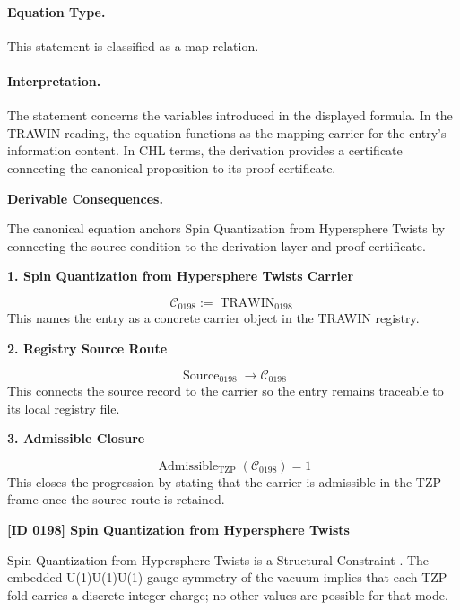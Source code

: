 \paragraph{Equation Type.}
This statement is classified as a map relation.

\paragraph{Interpretation.}
The statement concerns the variables introduced in the displayed formula. In the TRAWIN reading, the equation functions as the mapping carrier for the entry’s information content. In CHL terms, the derivation provides a certificate connecting the canonical proposition to its proof certificate.

\par\vspace{0.35em}
\noindent\textbf{Derivable Consequences.}\quad
\begingroup
\footnotesize
\raggedright
The canonical equation anchors Spin Quantization from Hypersphere Twists by connecting the source condition to the derivation layer and proof certificate.
\par\endgroup

\noindent\textbf{1. Spin Quantization from Hypersphere Twists Carrier}\par
\[
\mathcal{C}_{0198} := \operatorname{TRAWIN}_{0198}
\]
\noindent This names the entry as a concrete carrier object in the TRAWIN registry.\par
\noindent\textbf{2. Registry Source Route}\par
\[
\operatorname{Source}_{0198}\longrightarrow \mathcal{C}_{0198}
\]
\noindent This connects the source record to the carrier so the entry remains traceable to its local registry file.\par
\noindent\textbf{3. Admissible Closure}\par
\[
\operatorname{Admissible}_{\mathrm{TZP}}\!\left(\mathcal{C}_{0198}\right)=1
\]
\noindent This closes the progression by stating that the carrier is admissible in the TZP frame once the source route is retained.\par

\clearpage
\noindent\textbf{[ID 0198] Spin Quantization from Hypersphere Twists}\par
\vspace{0.35em}
\begingroup\small
{}
Spin Quantization from Hypersphere Twists is a Structural Constraint  . The embedded U(1)U(1)U(1) gauge symmetry of the vacuum implies that each TZP fold carries a discrete integer charge; no other values are possible for that mode.

